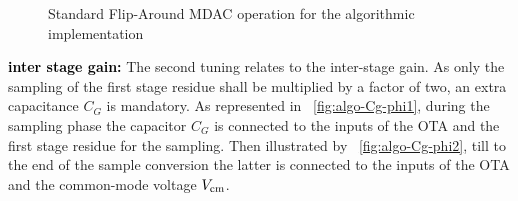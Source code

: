 \begin{figure}[htp]
\begin{subfigure}[b]{0.4\textwidth}
		\label{fig:algo-mdac-phi2}
	\end{subfigure}
	\caption{Standard Flip-Around MDAC operation for the algorithmic implementation}
	\label{fig:algo-mdac}
\end{figure}

\textbf{\textcolor{black}{inter stage gain:}}
The second tuning relates to the inter-stage gain. As only the sampling of the first stage residue shall be multiplied by a factor of two, an extra capacitance \(C_G\) is mandatory. As represented in \figurename~\ref{fig:algo-Cg-phi1}, during the sampling phase the capacitor \(C_G\) is connected to the inputs of the OTA and the first stage residue for the sampling. Then illustrated by \figurename~\ref{fig:algo-Cg-phi2}, till to the end of the sample conversion the latter is connected to the inputs of the OTA and the common-mode voltage \(V_{\rm cm}\).

